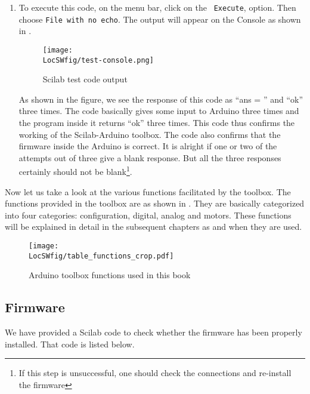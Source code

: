 \begin{enumerate}
      \item To execute this code, on the menu bar, click on the {\tt
                        Execute}, option. Then choose {\tt File with no echo}. The output
            will appear on the Console as shown in .
            \begin{figure}
                  \centering
                  \texttt{[image: \\LocSWfig/test-console.png]}
                  \caption{Scilab test code output}
                  \label{test-console}
            \end{figure}
            As shown in the figure, we see the response of this code as ``ans = '' and
            ``ok'' three times.  The
            code basically gives some input to Arduino three times and the
            program inside it returns ``ok'' three times.  This code thus confirms
            the working of the Scilab-Arduino toolbox.  The code also confirms
            that the firmware inside the Arduino is correct.  It is alright if
            one or two of the attempts out of three give a blank response.  But
            all the three responses certainly should not be
            blank\footnote{\label{fn:firmware}If this step is unsuccessful,
                  one should check the connections and re-install the firmware}.
\end{enumerate}

Now let us take a look at the various functions facilitated by the
toolbox. The functions provided in the toolbox are as shown in 
. They are basically categorized into four categories:
configuration, digital, analog and motors. These functions will be
explained in detail in the subsequent chapters as and when they are
used.

\begin{figure}
      \centering
      \texttt{[image: \\LocSWfig/table\_functions\_crop.pdf]}
      \caption{Arduino toolbox functions used in this book}
      \label{func}
\end{figure}

\subsection{Firmware}
\lstset{style=mystyle}
\label{sec:test-firmware-scilab}
We have provided a Scilab code to check whether the firmware has been
properly installed.  That code is listed below.

\begin{scicode}
      \label{sci:test-firmware}
      
\end{scicode}


